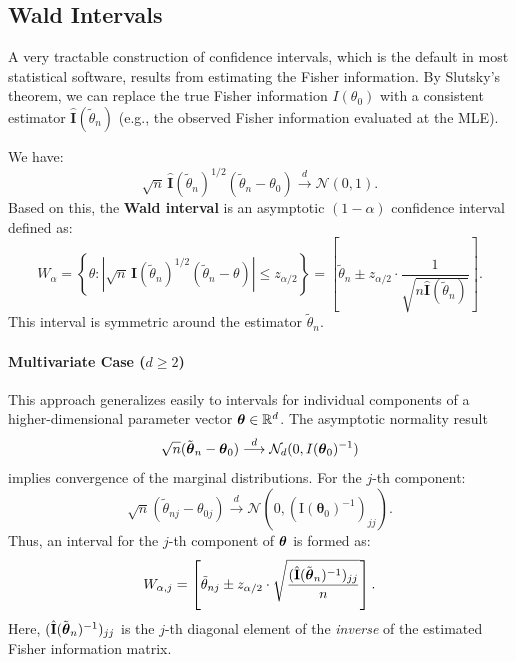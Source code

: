 \subsection{Wald Intervals}
\label{sub:Wald Intervals}

A very tractable construction of confidence intervals, which is the default in most statistical software, results from estimating the Fisher information. By Slutsky's theorem, we can replace the true Fisher information $I(\theta_0)$ with a consistent estimator $\hat{\mathbf{I}}(\tilde{\theta}_n)$ (e.g., the observed Fisher information evaluated at the MLE).

We have:
\[
\sqrt{n}\,\hat{\mathbf{I}}(\tilde{\theta}_n)^{1/2}(\tilde{\theta}_n-\theta_0)\stackrel{d}{\longrightarrow} \mathcal{N}(0,1).
\]
Based on this, the \textbf{Wald interval} is an asymptotic $(1 - \alpha)$ confidence interval defined as:
\[
W_{\alpha} = \left\{ \theta : \left| \sqrt{n} \, \hat{\mathbf{I}}(\tilde{\theta}_n)^{1/2} (\tilde{\theta}_n - \theta) \right| \le z_{\alpha/2} \right\} = \left[ \tilde{\theta}_n \pm z_{\alpha/2} \cdot \frac{1}{\sqrt{n \hat{\mathbf{I}}(\tilde{\theta}_n)}} \right].
\]
This interval is symmetric around the estimator $\tilde{\theta}_n$.

\paragraph{Multivariate Case ($d \ge 2$)}
This approach generalizes easily to intervals for individual components of a higher-dimensional parameter vector $\boldsymbol{\theta} \in \mathbb{R}^d$. The asymptotic normality result
\[
\sqrt{n}(\tilde{\boldsymbol{\theta}}_n - \boldsymbol{\theta}_0) \stackrel{d}{\longrightarrow} \mathcal{N}_d(0, I(\boldsymbol{\theta}_0)^{-1})
\]
implies convergence of the marginal distributions. For the $j$-th component:
\[
\sqrt{n}(\tilde{\theta}_{nj}-\theta_{0j}) \overset{d}{\longrightarrow} \mathcal{N}\left(0,\left(\mathrm{I}(\boldsymbol{\theta}_{0})^{-1}\right)_{jj}\right).
\]
Thus, an interval for the $j$-th component of $\boldsymbol{\theta}$ is formed as:
\[
W_{\alpha, j} = \left[\tilde{\theta}_{nj} \pm z_{\alpha/2} \cdot \sqrt{\frac{(\hat{\mathbf{I}}(\tilde{\boldsymbol{\theta}}_n)^{-1})_{jj}}{n}}\right].
\]
Here, $(\hat{\mathbf{I}}(\tilde{\boldsymbol{\theta}}_n)^{-1})_{jj}$ is the $j$-th diagonal element of the \textit{inverse} of the estimated Fisher information matrix.

\medskip

